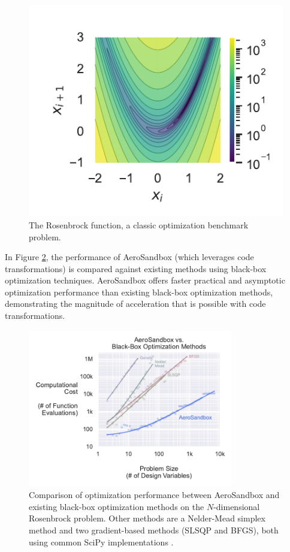 \documentclass[12pt,vi,oneside,table]{report}
\begin{document}
    \begin{figure}[H]
        \centering
        \includegraphics{../figures/rosenbrock_function.pdf}
        \caption{The Rosenbrock function, a classic optimization benchmark problem.}
        \label{fig:rosenbrock}
    \end{figure}

    In Figure \ref{fig:aerosandbox_scaling_comparison}, the performance of AeroSandbox (which leverages code transformations) is compared against existing methods using black-box optimization techniques. AeroSandbox offers faster practical and asymptotic optimization performance than existing black-box optimization methods, demonstrating the magnitude of acceleration that is possible with code transformations.

    \begin{figure}[H]
        \centering
        \includegraphics[width=0.8\textwidth]{../figures/benchmark_nd_rosenbrock.pdf}
        \caption{Comparison of optimization performance between AeroSandbox and existing black-box optimization methods on the $N$-dimensional Rosenbrock problem. Other methods are a Nelder-Mead simplex method and two gradient-based methods (SLSQP and BFGS), both using common SciPy implementations \cite{scipy}.}
        \label{fig:aerosandbox_scaling_comparison}
    \end{figure}
    
\end{document}
